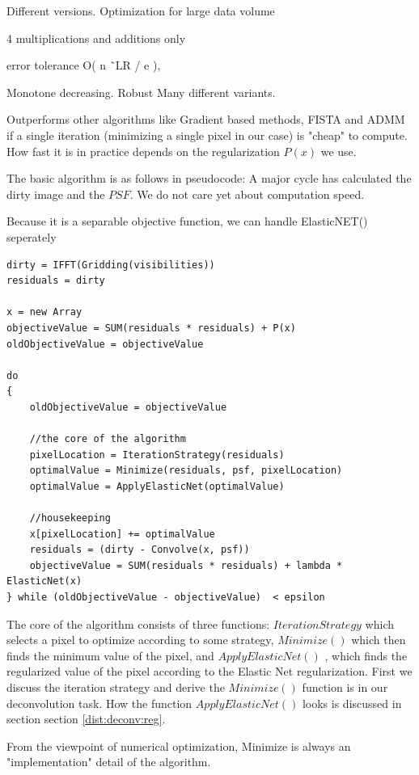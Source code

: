 Different versions.
Optimization for large data volume\cite{richtarik2016distributed}

4 multiplications and additions only\cite{richtarik2012efficient}

error tolerance O( n ˜LR / e ), \cite{richtarik2016parallel}




Monotone decreasing.
Robust
Many different variants.

Outperforms other algorithms like Gradient based methods, FISTA and ADMM if a single iteration (minimizing a single pixel in our case) is "cheap" to compute. 
How fast it is in practice depends on the regularization $P(x)$ we use.

The basic algorithm is as follows in pseudocode: A major cycle has calculated the dirty image and the $PSF$. We do not care yet about computation speed.

Because it is a separable objective function, we can handle ElasticNET() seperately

\begin{lstlisting}
dirty = IFFT(Gridding(visibilities))
residuals = dirty

x = new Array
objectiveValue = SUM(residuals * residuals) + P(x)
oldObjectiveValue = objectiveValue

do 
{
	oldObjectiveValue = objectiveValue

	//the core of the algorithm
	pixelLocation = IterationStrategy(residuals)
	optimalValue = Minimize(residuals, psf, pixelLocation)
	optimalValue = ApplyElasticNet(optimalValue)
	
	//housekeeping
	x[pixelLocation] += optimalValue
	residuals = (dirty - Convolve(x, psf))
	objectiveValue = SUM(residuals * residuals) + lambda * ElasticNet(x)
} while (oldObjectiveValue - objectiveValue)  < epsilon
\end{lstlisting}

The core of the algorithm consists of three functions: $IterationStrategy$ which selects a pixel to optimize according to some strategy, $Minimize()$ which then finds the minimum value of the pixel, and $ApplyElasticNet()$ , which finds the regularized value of the pixel according to the Elastic Net regularization. First we discuss the iteration strategy and derive the  $Minimize()$ function is in our deconvolution task. How the function $ApplyElasticNet()$ looks is discussed in section section \ref{dist:deconv:reg}.

From the viewpoint of numerical optimization, Minimize is always an "implementation" detail of the algorithm.


